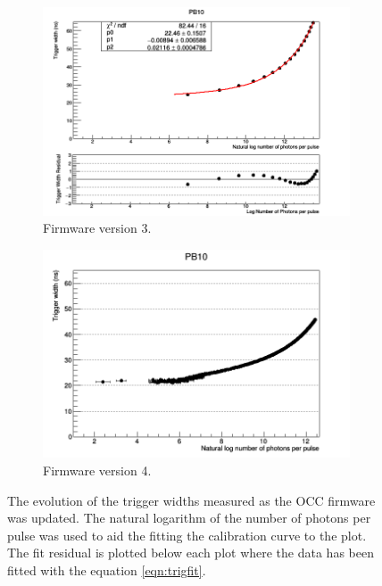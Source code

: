 \begin{figure}[ht!]
\begin{subfigure}[b]{.475\textwidth}
        \includegraphics[width=\textwidth]{Figures/Plots/V3_ln(Nph)vsTriggerWidthResidual.png}
        \caption{Firmware version 3.}
        \label{fig:trig3}
    \end{subfigure}
    \hfill
    \begin{subfigure}[b]{.475\textwidth}
        \centering
        \includegraphics[width=\textwidth]{Figures/Plots/V4_ln(Nph)VSTriggerWidthPB10.png}
        \caption{Firmware version 4.}
        \label{fig:trig4}
    \end{subfigure}
    \caption{The evolution of the trigger widths measured as the OCC firmware was updated. The natural logarithm of the number of photons per pulse was used to aid the fitting the calibration curve to the plot. The fit residual is plotted below each plot where the data has been fitted with the equation \ref{eqn:trigfit}.}
    \label{fig:trigw}
\end{figure}



